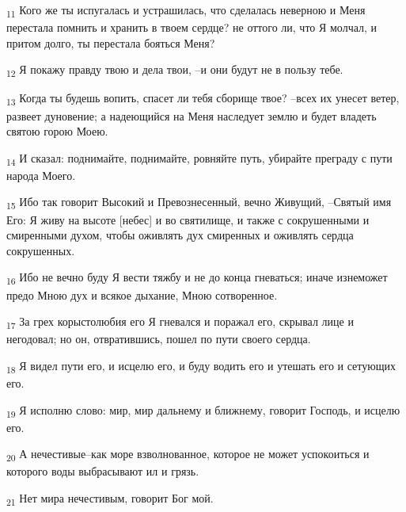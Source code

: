 \begin{tcolorbox}
\textsubscript{11} Кого же ты испугалась и устрашилась, что сделалась неверною и Меня перестала помнить и хранить в твоем сердце? не оттого ли, что Я молчал, и притом долго, ты перестала бояться Меня?
\end{tcolorbox}
\begin{tcolorbox}
\textsubscript{12} Я покажу правду твою и дела твои, --и они будут не в пользу тебе.
\end{tcolorbox}
\begin{tcolorbox}
\textsubscript{13} Когда ты будешь вопить, спасет ли тебя сборище твое? --всех их унесет ветер, развеет дуновение; а надеющийся на Меня наследует землю и будет владеть святою горою Моею.
\end{tcolorbox}
\begin{tcolorbox}
\textsubscript{14} И сказал: поднимайте, поднимайте, ровняйте путь, убирайте преграду с пути народа Моего.
\end{tcolorbox}
\begin{tcolorbox}
\textsubscript{15} Ибо так говорит Высокий и Превознесенный, вечно Живущий, --Святый имя Его: Я живу на высоте [небес] и во святилище, и также с сокрушенными и смиренными духом, чтобы оживлять дух смиренных и оживлять сердца сокрушенных.
\end{tcolorbox}
\begin{tcolorbox}
\textsubscript{16} Ибо не вечно буду Я вести тяжбу и не до конца гневаться; иначе изнеможет предо Мною дух и всякое дыхание, Мною сотворенное.
\end{tcolorbox}
\begin{tcolorbox}
\textsubscript{17} За грех корыстолюбия его Я гневался и поражал его, скрывал лице и негодовал; но он, отвратившись, пошел по пути своего сердца.
\end{tcolorbox}
\begin{tcolorbox}
\textsubscript{18} Я видел пути его, и исцелю его, и буду водить его и утешать его и сетующих его.
\end{tcolorbox}
\begin{tcolorbox}
\textsubscript{19} Я исполню слово: мир, мир дальнему и ближнему, говорит Господь, и исцелю его.
\end{tcolorbox}
\begin{tcolorbox}
\textsubscript{20} А нечестивые--как море взволнованное, которое не может успокоиться и которого воды выбрасывают ил и грязь.
\end{tcolorbox}
\begin{tcolorbox}
\textsubscript{21} Нет мира нечестивым, говорит Бог мой.
\end{tcolorbox}
